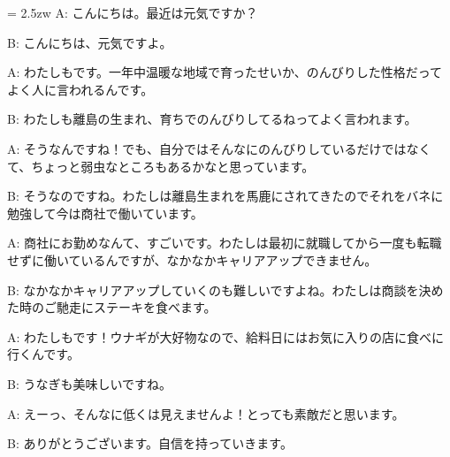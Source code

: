 \documentclass[11pt]{amsart}
\title{}
\author{}
\newenvironment{hangall}[1]{\hangindent = 2.5zw\everypar{\hangindent = 2.5zw}}{}
\begin{document}
\maketitle
\begin{hangall}{}%
A: こんにちは。最近は元気ですか？



B: こんにちは、元気ですよ。



A: わたしもです。一年中温暖な地域で育ったせいか、のんびりした性格だってよく人に言われるんです。



B: わたしも離島の生まれ、育ちでのんびりしてるねってよく言われます。



A: そうなんですね！でも、自分ではそんなにのんびりしているだけではなくて、ちょっと弱虫なところもあるかなと思っています。



B: そうなのですね。わたしは離島生まれを馬鹿にされてきたのでそれをバネに勉強して今は商社で働いています。



A: 商社にお勤めなんて、すごいです。わたしは最初に就職してから一度も転職せずに働いているんですが、なかなかキャリアアップできません。



B: なかなかキャリアアップしていくのも難しいですよね。わたしは商談を決めた時のご馳走にステーキを食べます。



A: わたしもです！ウナギが大好物なので、給料日にはお気に入りの店に食べに行くんです。



B: うなぎも美味しいですね。



A: えーっ、そんなに低くは見えませんよ！とっても素敵だと思います。



B: ありがとうございます。自信を持っていきます。\end{hangall}
\end{document}
